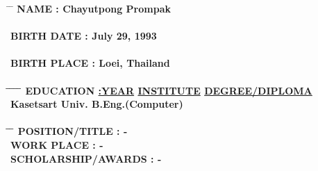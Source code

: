 \noindent\begin{tabbing}
\hspace{1.2in} \= \hspace{2in} \= \kill
\bf{NAME} \> : Chayutpong Prompak \\
\hspace{1in} \\
\bf{BIRTH DATE} \> : July 29, 1993 \\
\hspace{1in} \\
\bf{BIRTH PLACE} \> : Loei, Thailand \\
\hspace{1in} \\
\hspace{1.2in} \= \hspace{1in} \= \hspace{1.5in} \= \hspace{1in} \= \kill
\bf{EDUCATION} \> \underline{\bf{:YEAR}} \> \underline{\bf{INSTITUTE}} \> \underline{\bf{DEGREE/DIPLOMA}} \\
 \> Kasetsart Univ. \> B.Eng.(Computer)
\hspace{1in} \\
\hspace{1in} \\
\hspace{2in} \= \hspace{2in} \= \kill
\bf{POSITION/TITLE} \> : - \\
\bf{WORK PLACE} \> : - \\
\bf{SCHOLARSHIP/AWARDS} \> : - \\
\end{tabbing}